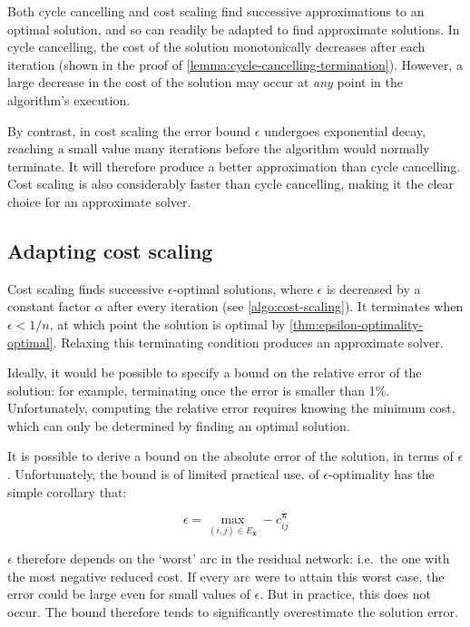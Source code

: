 Both cycle cancelling and cost scaling find successive approximations to an optimal solution, and so can readily be adapted to find approximate solutions. In cycle cancelling, the cost of the solution monotonically decreases after each iteration (shown in the proof of \cref{lemma:cycle-cancelling-termination}). However, a large decrease in the cost of the solution may occur at \emph{any} point in the algorithm's execution.

By contrast, in cost scaling the error bound $\epsilon$ undergoes exponential decay\footnotemark, reaching a small value many iterations before the algorithm would normally terminate. It will therefore produce a better approximation than cycle cancelling. Cost scaling is also considerably faster than cycle cancelling, making it the clear choice for an approximate solver.

\subsection{Adapting cost scaling} \label{sec:impl-approx-adaptions}

Cost scaling finds successive $\epsilon$-optimal solutions, where $\epsilon$ is decreased by a constant factor $\alpha$ after every iteration (see \cref{algo:cost-scaling}). It terminates when $\epsilon < 1/n$, at which point the solution is optimal by \cref{thm:epsilon-optimality-optimal}. Relaxing this terminating condition produces an approximate solver.

Ideally, it would be possible to specify a bound on the relative error of the solution: for example, terminating once the error is smaller than 1\%. Unfortunately, computing the relative error requires knowing the minimum cost, which can only be determined by finding an optimal solution.

It is possible to derive a bound on the absolute error of the solution, in terms of $\epsilon$. Unfortunately, the bound is of limited practical use.  of $\epsilon$-optimality has the simple corollary that:

\[\epsilon = \max_{(i,j) \in E_\mathbf{x}} -c_{ij}^{\boldsymbol{\pi}}\]

$\epsilon$ therefore depends on the `worst' arc in the residual network: i.e.\ the one with the most negative reduced cost. If every arc were to attain this worst case, the error could be large even for small values of $\epsilon$. But in practice, this does not occur. The bound therefore tends to significantly overestimate the solution error.

